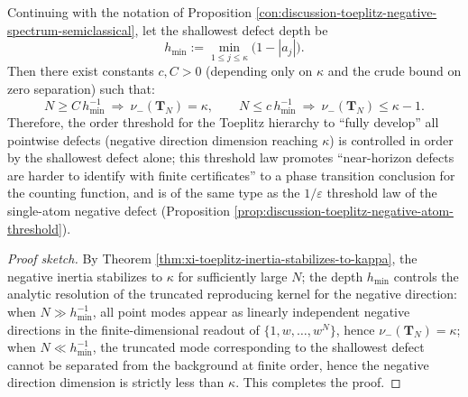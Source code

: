 \begin{proposition}\label{con:discussion-toeplitz-negative-count-threshold}
Continuing with the notation of Proposition \ref{con:discussion-toeplitz-negative-spectrum-semiclassical}, let the shallowest defect depth be
\[
h_{\min}:=\min_{1\le j\le \kappa}\bigl(1-|a_j|\bigr).
\]
Then there exist constants \(c,C>0\) (depending only on \(\kappa\) and the crude bound on zero separation) such that:
\[
\boxed{\;
N\ge C\,h_{\min}^{-1}\ \Longrightarrow\ \nu_-(\mathbf{T}_N)=\kappa,\qquad
N\le c\,h_{\min}^{-1}\ \Longrightarrow\ \nu_-(\mathbf{T}_N)\le \kappa-1.\;}
\]
Therefore, the order threshold for the Toeplitz hierarchy to ``fully develop'' all pointwise defects (negative direction dimension reaching \(\kappa\)) is controlled in order by the shallowest defect alone; this threshold law promotes ``near-horizon defects are harder to identify with finite certificates'' to a phase transition conclusion for the counting function, and is of the same type as the \(1/\varepsilon\) threshold law of the single-atom negative defect (Proposition \ref{prop:discussion-toeplitz-negative-atom-threshold}).
\end{proposition}
\begin{proof}[Proof sketch]
By Theorem \ref{thm:xi-toeplitz-inertia-stabilizes-to-kappa}, the negative inertia stabilizes to \(\kappa\) for sufficiently large \(N\);
the depth \(h_{\min}\) controls the analytic resolution of the truncated reproducing kernel for the negative direction: when \(N\gg h_{\min}^{-1}\), all point modes appear as linearly independent negative directions in the finite-dimensional readout of \(\{1,w,\dots,w^N\}\), hence \(\nu_-(\mathbf{T}_N)=\kappa\);
when \(N\ll h_{\min}^{-1}\), the truncated mode corresponding to the shallowest defect cannot be separated from the background at finite order, hence the negative direction dimension is strictly less than \(\kappa\). This completes the proof.
\end{proof}

